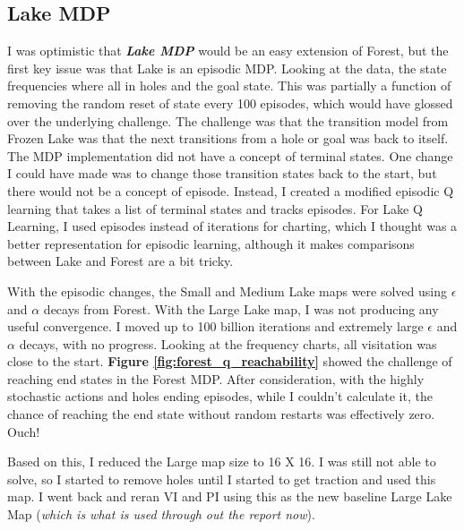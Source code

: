 \documentclass[letterpaper]{article} %
\begin{document}
\subsection{Lake MDP} 
I was optimistic that \textbf{\emph{Lake MDP}} would be an easy extension of Forest, but the first key issue was that Lake is an episodic MDP.  Looking at the data, the state frequencies where all in holes and the goal state.  This was partially a function of removing the random reset of state every 100 episodes, which would have glossed over the underlying challenge.  The challenge was that the transition model from Frozen Lake was that the next transitions from a hole or goal was back to itself.  The MDP implementation did not have a concept of terminal states.  One change I could have made was to change those transition states back to the start, but there would not be a concept of episode.  Instead, I created a modified episodic Q learning that takes a list of terminal states and tracks episodes.  For Lake Q Learning, I used episodes instead of iterations for charting, which I thought was a better representation for episodic learning, although it makes comparisons between Lake and Forest are a bit tricky.

With the episodic changes, the Small and Medium Lake maps were solved using  $\epsilon$ and $\alpha$ decays from Forest.  With the Large Lake map, I was not producing any useful convergence.  I moved up to 100 billion iterations and extremely large $\epsilon$ and $\alpha$ decays, with no progress.  Looking at the frequency charts, all visitation was close to the start.   \textbf{Figure \ref{fig:forest_q_reachability}} showed the challenge of reaching end states in the Forest MDP.  After consideration, with the highly stochastic actions and holes ending episodes, while I couldn't calculate it, the chance of reaching the end state without random restarts was effectively zero.  Ouch!

Based on this, I reduced the Large map size to 16 X 16.  I was still not able to solve, so I started to remove holes until I started to get traction and used this map. I went back and reran VI and PI using this as the new baseline Large Lake Map  (\emph{which is what is used through out the report now}).  
\end{document}
